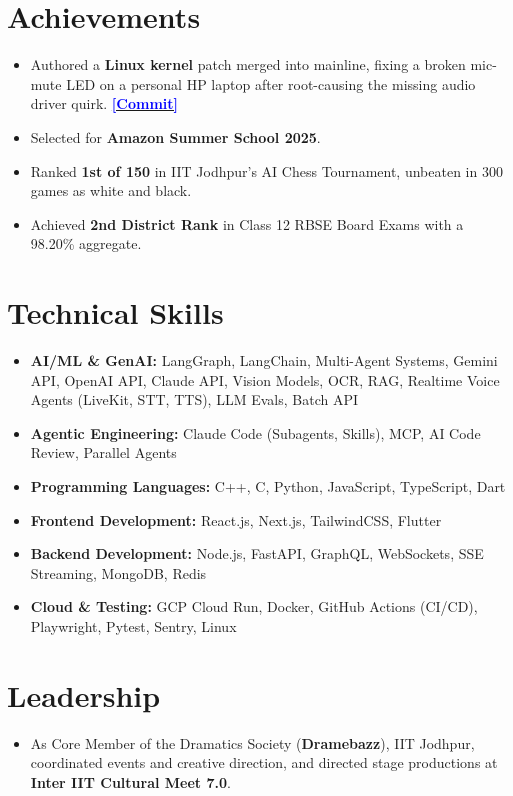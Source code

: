 \documentclass[a4paper,10pt]{article}
\begin{document}
\section{Achievements}
\begin{itemize}
\item Authored a \textbf{Linux kernel} patch merged into mainline, fixing a broken mic-mute LED on a personal HP laptop after root-causing the missing audio driver quirk.  \href{https://github.com/torvalds/linux/commit/f56521ab6f76faeaa5a524320898835454e3bc31}{\textcolor{blue}{\textbf{[Commit]}}}
\item Selected for \textbf{Amazon Summer School 2025}.
\item Ranked \textbf{1st of 150} in IIT Jodhpur's AI Chess Tournament, unbeaten in 300 games as white and black.
\item Achieved \textbf{2nd District Rank} in Class 12 RBSE Board Exams with a 98.20\% aggregate.
\end{itemize}
\vspace{-1mm}
\section{Technical Skills}
\begin{itemize}
\itemsep0em
    \item \textbf{AI/ML \& GenAI: } LangGraph, LangChain, Multi-Agent Systems, Gemini API, OpenAI API, Claude API, Vision Models, OCR, RAG, Realtime Voice Agents (LiveKit, STT, TTS), LLM Evals, Batch API
    \item \textbf{Agentic Engineering: } Claude Code (Subagents, Skills), MCP, AI Code Review, Parallel Agents
    \item \textbf{Programming Languages: } C++, C, Python, JavaScript, TypeScript, Dart
    \item \textbf{Frontend Development: } React.js, Next.js, TailwindCSS, Flutter
    \item \textbf{Backend Development: } Node.js, FastAPI, GraphQL, WebSockets, SSE Streaming, MongoDB, Redis
    \item \textbf{Cloud \& Testing: } GCP Cloud Run, Docker, GitHub Actions (CI/CD), Playwright, Pytest, Sentry, Linux
\end{itemize}
\vspace{-1mm}

\section{Leadership}
\begin{itemize}
\item As Core Member of the Dramatics Society (\textbf{Dramebazz}), IIT Jodhpur, coordinated events and creative direction, and directed stage productions at \textbf{Inter IIT Cultural Meet 7.0}.
\end{itemize}
\end{document}
